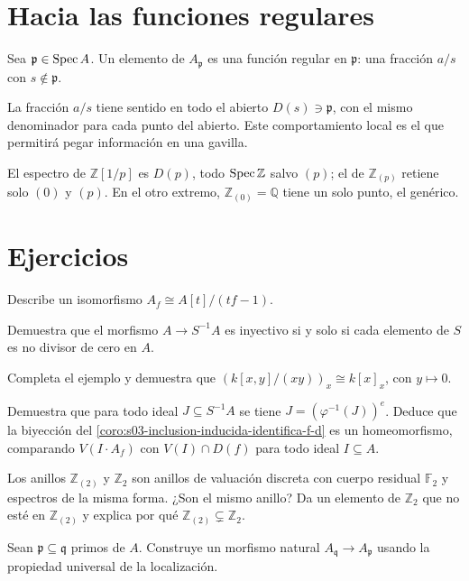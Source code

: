 \section{Hacia las funciones regulares}

\begin{defi}
\label{defi:s03-funcion-regular-punto}
Sea $\mathfrak p\in\operatorname{Spec} A$. Un elemento de $A_{\mathfrak p}$ es una función regular en $\mathfrak p$: una fracción $a/s$ con $s\notin\mathfrak p$.
\end{defi}

\begin{obs}
\label{obs:s03-fraccion-s-tiene-sentido-todo}
La fracción $a/s$ tiene sentido en todo el abierto $D(s)\ni\mathfrak p$, con el mismo denominador para cada punto del abierto. Este comportamiento local es el que permitirá pegar información en una gavilla.
\end{obs}

El espectro de $\mathbb Z[1/p]$ es $D(p)$, todo $\operatorname{Spec}\mathbb Z$ salvo $(p)$; el de $\mathbb Z_{(p)}$ retiene solo $(0)$ y $(p)$. En el otro extremo, $\mathbb Z_{(0)}=\mathbb Q$ tiene un solo punto, el genérico.

\section{Ejercicios}

\begin{ejer}
\label{ejer:s03-describe-isomorfismo-f-t-tf}
Describe un isomorfismo $A_f\cong A[t]/(tf-1)$.
\end{ejer}
\begin{ejer}
\label{ejer:s03-demuestra-morfismo-s-1-inyectivo}
Demuestra que el morfismo $A\to S^{-1}A$ es inyectivo si y solo si cada elemento de $S$ es no divisor de cero en $A$.
\end{ejer}
\begin{ejer}
\label{ejer:s03-completa-ejemplo-demuestra-k-x}
Completa el ejemplo y demuestra que $(k[x,y]/(xy))_x\cong k[x]_x$, con $y\mapsto0$.
\end{ejer}
\begin{ejer}
\label{ejer:s03-demuestra-todo-ideal-j-s}
Demuestra que para todo ideal $J\subseteq S^{-1}A$ se tiene $J=(\varphi^{-1}(J))^e$. Deduce que la biyección del \cref{coro:s03-inclusion-inducida-identifica-f-d} es un homeomorfismo, comparando $V(I\cdot A_f)$ con $V(I)\cap D(f)$ para todo ideal $I\subseteq A$.
\end{ejer}
\begin{ejer}
\label{ejer:s03-anillos-z-2-z-2}
Los anillos $\mathbb Z_{(2)}$ y $\mathbb Z_2$ son anillos de valuación discreta con cuerpo residual $\mathbb F_2$ y espectros de la misma forma. ¿Son el mismo anillo? Da un elemento de $\mathbb Z_2$ que no esté en $\mathbb Z_{(2)}$ y explica por qué $\mathbb Z_{(2)}\subsetneq\mathbb Z_2$.
\end{ejer}
\begin{ejer}
\label{ejer:s03-sean-p-q-primos-construye}
Sean $\mathfrak p\subseteq\mathfrak q$ primos de $A$. Construye un morfismo natural $A_{\mathfrak q}\to A_{\mathfrak p}$ usando la propiedad universal de la localización.
\end{ejer}
